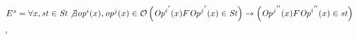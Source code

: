 \documentclass{sig-alternate-05-2015}
\begin{document}
 \\ $E^s = \forall x, \mathit{st} \in \mathit{St} \not\exists {\mathit{op}^i}(x), {\mathit{op}^j}(x) \in \mathcal{O}  \\ \left( {\mathit{Op}^i}^{'}(x) F {\mathit{Op}^j}^{'} (x) \in \mathit{St} \right) \rightarrow  
 \left(  {\mathit{Op}^j}^{''}(x) F {\mathit{Op}^i}^{''} (x) \in \mathit{st} \right)$,   \\
\end{document}
